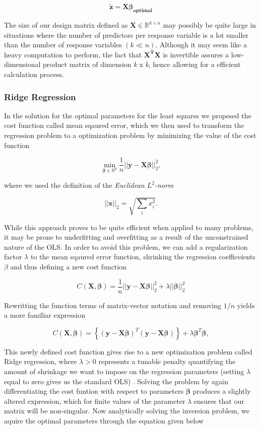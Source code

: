 \documentclass[a4paper, 10pt]{article}
\begin{document}
$$
\boldsymbol{\tilde{z}} = \boldsymbol{X} \boldsymbol{\beta_{optimal}}
$$

The size of our design matrix defined as $\boldsymbol{X}\in {\mathbb{R}}^{k\times n}$ may possibly be quite large in situations where the number of predictors per response variable is a lot smaller than the number of response variables $(k \ll n)$. Although it may seem like a heavy computation to perform, the fact that $\boldsymbol{X^TX}$ is invertible assures a low-dimensional product matrix of dimension \emph{k} x \emph{k}, hence allowing for a efficient calculation process. 

\subsubsection{Ridge Regression}
In the solution for the optimal parameters for the least squares we propesed the cost function called mean sqaured error, which we then used to transform the regression problem to a optimization problem by minimizing the value of the cost function 

$$
{\displaystyle \min_{\boldsymbol{\beta}\in
{\mathbb{R}}^{p}}}\frac{1}{n}\vert\vert \boldsymbol{y}-\boldsymbol{X}\boldsymbol{\beta}\vert\vert_2^2,
$$

where we used the definition of the \emph{Euclidean $L^2$-norm}

$$
\vert\vert \boldsymbol{x}\vert\vert_2 = \sqrt{\sum_i x_i^2}.
$$


While this approach proves to be quite efficient when applied to many problems, it may be prone to underfitting and overfitting as a result of the unconstrained nature of the OLS. In order to avoid this problem, we can add a regularization factor $\lambda$ to the mean sqaured error function, shrinking the regression coefficeients $\beta$ and thus defining a new cost function   

$$
{\displaystyle C(\boldsymbol{X},\boldsymbol{\beta})=\frac{1}{n}\vert\vert \boldsymbol{y}-\boldsymbol{X}\boldsymbol{\beta}\vert\vert_2^2+\lambda\vert\vert \boldsymbol{\beta}\vert\vert_2^2}
$$

Rewritting the function terms of matrix-vector notation and removing $1/n$ yields a more familiar expression 

$$
C(\boldsymbol{X},\boldsymbol{\beta})=\left\{(\boldsymbol{y}-\boldsymbol{X}\boldsymbol{\beta})^T(\boldsymbol{y}-\boldsymbol{X}\boldsymbol{\beta})\right\}+\lambda\boldsymbol{\beta}^T\boldsymbol{\beta},
$$

This newly defined cost function gives rise to a new optimization problem called Ridge regression, where $\lambda > 0$ represents a tunable penalty quantifying the amount of shrinkage we want to impose on the regression parameters (setting $\lambda$ equal to zero gives us the standard OLS) . Solving the problem by again differentiating the cost funtion with respect to parameters $\boldsymbol{\beta}$ produces a slightly altered expression, which for finite values of the  parameter $\lambda$ ensures that our matrix will be non-singular. Now analytically solving the inversion problem, we aquire the optimal parameters through the equation given below 
\end{document}
